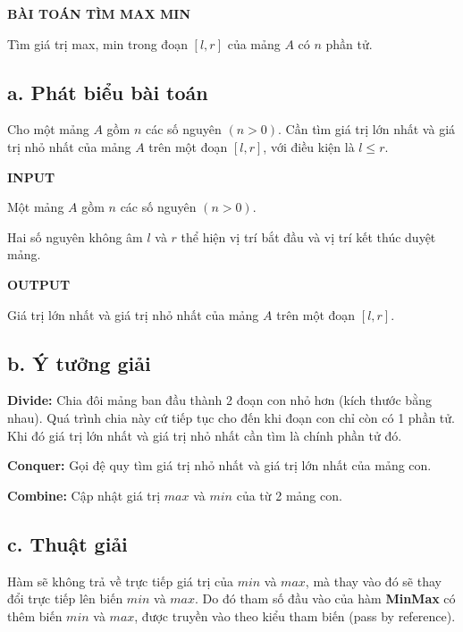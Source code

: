\documentclass[12pt, a4paper, fleqn]{article}
\begin{document}
	
		\textbf{BÀI TOÁN TÌM MAX MIN}
	
		Tìm giá trị max, min trong đoạn $[l, r]$ của mảng $A$ có $n$ phần tử.
		
		\subsection*{a. Phát biểu bài toán}
			Cho một mảng $A$ gồm $n$ các số nguyên $(n > 0)$. Cần tìm giá trị lớn nhất và giá trị nhỏ nhất của mảng $A$ trên một đoạn $[l, r]$, với điều kiện là $l \leq r$.
				
			\textbf{INPUT}
			
			Một mảng $A$ gồm $n$ các số nguyên $(n > 0)$.
			
			Hai số nguyên không âm $l$ và $r$ thể hiện vị trí bắt đầu và vị trí kết thúc duyệt mảng.
			
			\textbf{OUTPUT}
			
			Giá trị lớn nhất và giá trị nhỏ nhất của mảng $A$ trên một đoạn $[l, r]$.
			
		\subsection*{b. Ý tưởng giải}
		
			\textbf{Divide:} Chia đôi mảng ban đầu thành 2 đoạn con nhỏ hơn (kích thước bằng nhau). Quá trình chia này cứ tiếp tục cho đến khi đoạn con chỉ còn có 1 phần tử. Khi đó giá trị lớn nhất và giá trị nhỏ nhất cần tìm là chính phần tử đó.
			
			\textbf{Conquer:} Gọi đệ quy tìm giá trị nhỏ nhất và giá trị lớn nhất của mảng con.
			
			\textbf{Combine:} Cập nhật giá trị $max$ và $min$ của từ 2 mảng con.
			
		\subsection*{c. Thuật giải}
		
		Hàm sẽ không trả về trực tiếp giá trị của $min$ và $max$, mà thay vào đó sẽ thay đổi trực tiếp lên biến $min$ và $max$. Do đó tham số đầu vào của hàm \textbf{MinMax} có thêm biến $min$ và $max$, được truyền vào theo kiểu tham biến (pass by reference).
		
\end{document}
